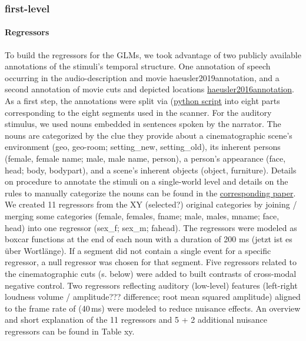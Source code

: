 \documentclass[english]{article}
\begin{document}
\subsubsection{first-level}
\paragraph{Regressors }
To build the regressors for the GLMs, we took advantage of two publicly available annotations of the stimuli's temporal structure. One annotation of speech occurring in the audio-description and movie {haeusler2019annotation}, and a second annotation of movie cuts and depicted locations \href{https://f1000research.com/articles/5-2273}{haeusler2016annotation}. As a first step, the annotations were split via (\href{"https://github.com/chrhaeusler/studyforrest-data-annotations/blob/master/code/researchcut2segments.py"}{python script} into eight parts corresponding to the eight segments used in the scanner.
For the auditory stimulus, we used nouns embedded in sentences spoken by the narrator. The nouns are categorized by the clue they provide about a cinematographic scene's environment  (geo, geo-room; setting\_new, setting\_old), its inherent persons (female, female name; male, male name, person), a person's appearance (face, head; body, bodypart), and a scene's inherent objects (object, furniture). Details on procedure to annotate the stimuli on a single-world level and details on the rules to manually categorize the nouns can be found in the \href{"https://www.overleaf.com/project/5d4ab1b759001b5db6ea2bc3"}{corresponding paper}. We created 11 regressors from the XY (selected?) original categories by joining / merging some categories (female, females, fname; male, males, mname; face, head) into one regressor (sex\_f; sex\_m; fahead). The regressors were modeled as boxcar functions at the end of each noun with a duration of 200 ms (jetzt ist es über Wortlänge). If a segment did not contain a single event for a specific regressor, a null regressor was chosen for that segment. Five regressors related to the cinematographic cuts (s. below) were added to built contrasts of cross-modal negative control. Two regressors reflecting auditory (low-level) features (left-right loudness volume / amplitude??? difference; root mean squared amplitude) aligned to the frame rate of (40\,ms) were modeled to reduce nuisance effects. An overview and short explanation of the 11 regressors and 5 + 2 additional nuisance regressors can be found in Table xy.
\end{document}
